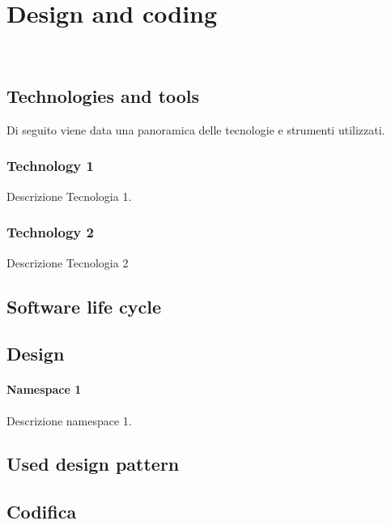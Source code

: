 
\chapter{Design and coding}
\label{cap:progettazione-codifica}

\\

\section{Technologies and tools}
\label{sec:tecnologie-strumenti}

Di seguito viene data una panoramica delle tecnologie e strumenti utilizzati.

\subsection*{Technology 1}
Descrizione Tecnologia 1.

\subsection*{Technology 2}
Descrizione Tecnologia 2

\section{Software life cycle}
\label{sec:ciclo-vita-software}

\section{Design}
\label{sec:progettazione}

\subsubsection{Namespace 1} %
Descrizione namespace 1.

\begin{namespacedesc}
\end{namespacedesc}


\section{Used design pattern}

\section{Codifica}
